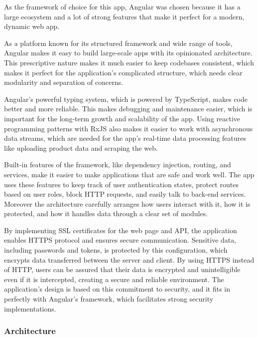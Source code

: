 As the framework of choice for this app, Angular was chosen because it has a large ecosystem and a lot of strong features that make it perfect for a modern, dynamic web app.

As a platform known for its structured framework and wide range of tools, Angular makes it easy to build large-scale apps with its opinionated architecture. This prescriptive nature makes it much easier to keep codebases consistent, which makes it perfect for the application's complicated structure, which needs clear modularity and separation of concerns.

Angular's powerful typing system, which is powered by TypeScript, makes code better and more reliable. This makes debugging and maintenance easier, which is important for the long-term growth and scalability of the app. Using reactive programming patterns with RxJS also makes it easier to work with asynchronous data streams, which are needed for the app's real-time data processing features like uploading product data and scraping the web.

Built-in features of the framework, like dependency injection, routing, and services, make it easier to make applications that are safe and work well. The app uses these features to keep track of user authentication states, protect routes based on user roles, block HTTP requests, and easily talk to back-end services. Moreover the architecture carefully arranges how users interact with it, how it is protected, and how it handles data through a clear set of modules.
\newline\cite{angular}

By implementing SSL certificates for the web page and API, the application enables HTTPS protocol and ensures secure communication. Sensitive data, including passwords and tokens, is protected by this configuration, which encrypts data transferred between the server and client. By using HTTPS instead of HTTP, users can be assured that their data is encrypted and unintelligible even if it is intercepted, creating a secure and reliable environment. The application's design is based on this commitment to security, and it fits in perfectly with Angular's framework, which facilitates strong security implementations.

\newpage

\subsubsection{Architecture}

